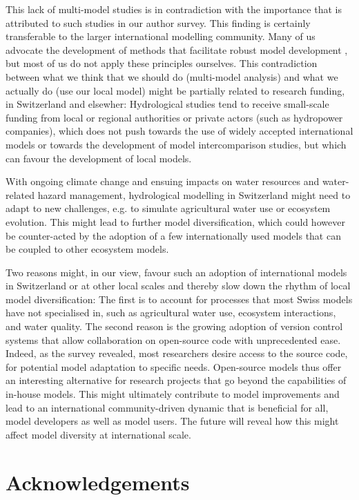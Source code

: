 \documentclass[10pt,a4paper]{article}
\begin{document}
This lack of multi-model studies is in contradiction with the importance that is attributed to such studies in our author survey. This finding is certainly transferable to the larger international modelling community. Many of us advocate the development of methods that facilitate robust model development \citep{Zheng2018}, but most of us do not apply these principles ourselves. This contradiction between what we think that we should do (multi-model analysis) and what we actually do (use our local model) might be partially related to research funding, in Switzerland and elsewher: Hydrological studies tend to receive small-scale funding from local or regional authorities or private actors (such as hydropower companies), which does not push towards the use of widely accepted international models or towards the development of model intercomparison studies, but which can favour the development of local models.

With ongoing climate change and ensuing impacts on water resources and water-related hazard management, hydrological modelling in Switzerland might need to adapt to new challenges, e.g. to simulate agricultural water use or ecosystem evolution. This might lead to further model diversification, which could however be counter-acted by the adoption of a few internationally used models that can be coupled to other ecosystem models. 

Two reasons might, in our view, favour such an adoption of international models in Switzerland or at other local scales and thereby slow down the rhythm of local model diversification: The first is to account for processes that most Swiss models have not specialised in, such as agricultural water use, ecosystem interactions, and water quality. The second reason is the growing adoption of version control systems that allow collaboration on open-source code with unprecedented ease. Indeed, as the survey revealed, most researchers desire access to the source code, for potential model adaptation to specific needs. Open-source models thus offer an interesting alternative for research projects that go beyond the capabilities of in-house models. This might ultimately contribute to model improvements and lead to an international community-driven dynamic that is beneficial for all, model developers as well as model users. The future will reveal how this might affect model diversity at international scale. 


\section*{Acknowledgements}
\end{document}
